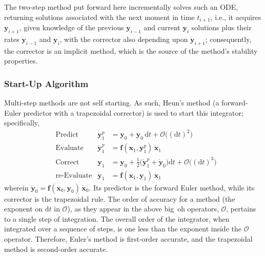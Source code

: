 The two-step method put forward here incrementally solves such an ODE, returning solutions associated with the next moment in time $t_{i+1}$, i.e., it acquires $\mathbf{y}_{i+1}$, given knowledge of the  previous $\mathbf{y}_{i-1}$ and current $\mathbf{y}_i$ solutions plus their rates $\dot{\mathbf{y}}_{i-1}$ and $\dot{\mathbf{y}}_i$, with the corrector also depending upon $\dot{\mathbf{y}}_{i+1}$; consequently, the corrector is an implicit method, which is the source of the method's stability properties.

\subsubsection{Start-Up Algorithm}

Multi-step methods are not self starting.  As such, Heun's method (a forward-Euler predictor with a trapezoidal corrector) is used to start this integrator; specifically,
\begin{subequations}
    \label{startUp1stOrderODEs}
    \begin{align}
    \mbox{} & \text{Predict} & 
    \mathbf{y}_1^p & = \mathbf{y}_0 + \dot{\mathbf{y}}_0 \, \mathrm{d}t + 
    \mathcal{O} \bigl( (\mathrm{d}t)^2 \bigr)
    \label{startUp1stOrderPredictor} \\
    \mbox{} & \text{Evaluate} & 
    \dot{\mathbf{y}}^p_1 & = \mathbf{f} (\mathbf{x}_1 , \mathbf{y}_1^p) \, 
    \dot{\mathbf{x}}_1
    \label{startUp1stEvaluate} \\
    \mbox{} & \text{Correct} &
    \mathbf{y}_1 & = \mathbf{y}_0 + \tfrac{1}{2} 
    \bigl( \dot{\mathbf{y}}_1^p + \dot{\mathbf{y}}_0 \bigr) \mathrm{d}t + 
    \mathcal{O} \bigl( (\mathrm{d}t)^3 \bigr)
    \label{startUp1stOrderCorrector} \\
    \mbox{} & \text{re-Evaluate} & 
    \dot{\mathbf{y}}_1 & = \mathbf{f} (\mathbf{x}_1 , \mathbf{y}_1) \,
    \dot{\mathbf{x}}_1 
    \label{startUp1stReEvaluate}
    \end{align}
\end{subequations}
wherein $\dot{\mathbf{y}}_0 = \mathbf{f}(\mathbf{x}_0, \mathbf{y}_0) \, \dot{\mathbf{x}}_0$.  Its predictor is the forward Euler method, while its corrector is the trapezoidal rule.  The order of accuracy for a method (the exponent on $\mathrm{d}t$ in $\mathcal{O}$), as they appear in the above big~oh operators, $\mathcal{O}$, pertains to a single step of integration.  The overall order of the integrator, when integrated over a sequence of steps, is one less than the exponent inside the $\mathcal{O}$ operator.  Therefore, Euler's method is first-order accurate, and the trapezoidal method is second-order accurate.

